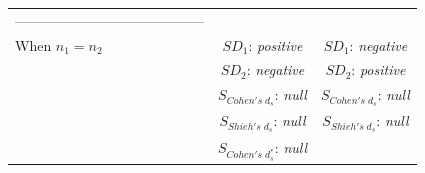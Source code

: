 \documentclass[
  english,
  man]{apa6}
\begin{document}
\begin{longtable}[]{@{}lcc@{}}
\begin{minipage}[t]{0.35\columnwidth}
-----------------------------------------\strut
\end{minipage}\tabularnewline
\begin{minipage}[t]{0.27\columnwidth}\raggedright
When \(n_1=n_2\)\strut
\end{minipage} & \begin{minipage}[t]{0.29\columnwidth}\centering
\(SD_1\): \emph{positive}\strut
\end{minipage} & \begin{minipage}[t]{0.35\columnwidth}\centering
\(SD_1\): \emph{negative}\strut
\end{minipage}\tabularnewline
\begin{minipage}[t]{0.27\columnwidth}\raggedright
\strut
\end{minipage} & \begin{minipage}[t]{0.29\columnwidth}\centering
\(SD_2\): \emph{negative}\strut
\end{minipage} & \begin{minipage}[t]{0.35\columnwidth}\centering
\(SD_2\): \emph{positive}\strut
\end{minipage}\tabularnewline
\begin{minipage}[t]{0.27\columnwidth}\raggedright
\strut
\end{minipage} & \begin{minipage}[t]{0.29\columnwidth}\centering
\(S_{Cohen's \; d_s}\): \emph{null}\strut
\end{minipage} & \begin{minipage}[t]{0.35\columnwidth}\centering
\(S_{Cohen's \; d_s}\): \emph{null}\strut
\end{minipage}\tabularnewline
\begin{minipage}[t]{0.27\columnwidth}\raggedright
\strut
\end{minipage} & \begin{minipage}[t]{0.29\columnwidth}\centering
\(S_{Shieh's \; d_s}\): \emph{null}\strut
\end{minipage} & \begin{minipage}[t]{0.35\columnwidth}\centering
\(S_{Shieh's \; d_s}\): \emph{null}\strut
\end{minipage}\tabularnewline
\begin{minipage}[t]{0.27\columnwidth}\raggedright
\strut
\end{minipage} & \begin{minipage}[t]{0.29\columnwidth}\centering
\(S_{Cohen's \; d^*_s}\): \emph{null}\strut
\end{minipage} & \begin{minipage}[t]{0.35\columnwidth}\centering

\end{minipage}
\end{longtable}
\end{document}
